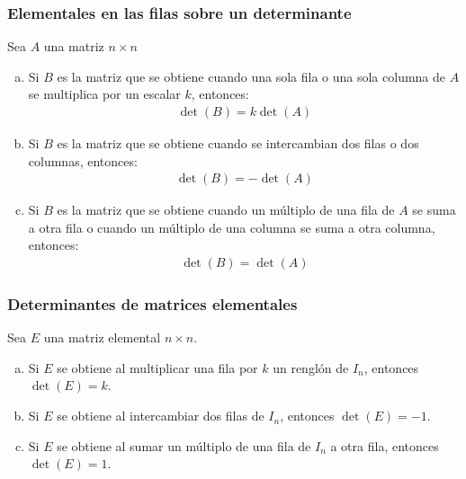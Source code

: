 \documentclass[a4paper,12pt]{article}
\begin{document}
\subsubsection{Elementales en las filas sobre un determinante}

\begin{theorem}
  Sea $A$ una matriz $n\times n$
  \begin{enumerate}[(a)]
    \item Si $B$ es la matriz que se obtiene cuando una sola fila o una sola
      columna de $A$ se multiplica por un escalar $k$, entonces:
      \begin{align*}
        \det(B)=k\det(A)
      \end{align*}
    \item Si $B$ es la matriz que se obtiene cuando se intercambian dos filas
      o dos columnas, entonces:
      \begin{align*}
        \det(B)=-\det(A)
      \end{align*}
    \item Si $B$ es la matriz que se obtiene cuando un múltiplo de una fila de
      $A$ se suma a otra fila o cuando un múltiplo de una columna se suma a
      otra columna, entonces:
      \begin{align*}
        \det(B)=\det(A)
      \end{align*}
  \end{enumerate}
  \label{theo:det_op_elem}
\end{theorem}

\subsubsection{Determinantes de matrices elementales}
\begin{theorem}
  Sea $E$ una matriz elemental $n\times n$.
  \begin{enumerate}[(a)]
    \item Si $E$ se obtiene al multiplicar una fila por $k$ un renglón de
      $I_n$, entonces $\det(E)=k$.
    \item Si $E$ se obtiene al intercambiar dos filas de $I_n$, entonces
      $\det(E)=-1$.
    \item Si $E$ se obtiene al sumar un múltiplo de una fila de $I_n$ a otra
      fila, entonces $\det(E)=1$.
  \end{enumerate}
  \label{theo:det_matr_elem}
\end{theorem}
\end{document}
